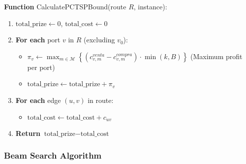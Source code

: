 \documentclass[12pt]{article}
\begin{document}
\textbf{Function} CalculatePCTSPBound(route $R$, instance):
\begin{enumerate}
    \item $\text{total\_prize} \gets 0$, $\text{total\_cost} \gets 0$
    \item \textbf{For each} port $v$ in $R$ (excluding $v_0$):
    \begin{itemize}
        \item $\pi_v \gets \max_{m \in \mathcal{M}} \left\{ (c_{v,m}^{venta} - c_{v,m}^{compra}) \cdot \min(k, B) \right\}$ (Maximum profit per port)
        \item $\text{total\_prize} \gets \text{total\_prize} + \pi_v$
    \end{itemize}
    \item \textbf{For each} edge $(u, v)$ in route:
    \begin{itemize}
        \item $\text{total\_cost} \gets \text{total\_cost} + c_{uv}$
    \end{itemize}
    \item \textbf{Return} $\text{total\_prize} - \text{total\_cost}$
\end{enumerate}

\subsubsection{Beam Search Algorithm}
\end{document}
